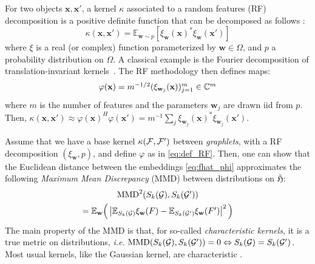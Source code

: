 \documentclass{article}
\begin{document}
For two objects $\mathbf{x}, \mathbf{x'}$, a kernel $\kappa$ associated to a random features (RF) decomposition is a positive definite function that can be decomposed  as follows \cite{rahimi2008random}:
\begin{equation}
\label{eq:RF_decomposition}
\kappa(\mathbf{x},\mathbf{x}')=\mathbb{E}_{\mathbf{w}\sim p}[ \xi_\mathbf{w}(\mathbf{x})^* \xi_\mathbf{w}(\mathbf{x}')]
\end{equation}
where $\xi$ is a real (or complex) function parameterized by $\mathbf{w} \in \Omega$, and $p$ a probability distribution on $\Omega$. A classical example is the Fourier decomposition of translation-invariant kernels~\cite{rahimi2008random}.
The RF methodology then defines maps:
\begin{equation}
	\label{eq:def_RF}
	\mathsmaller{
	\varphi(\mathbf{x}) = m^{-1/2} ( \xi_{\mathbf{w}_j}(\mathbf{x}) )_{j=1}^m \in \mathbb{C}^m}
\end{equation}
where $m$ is the number of features and the parameters $\mathbf{w}_j$ are drawn iid from $p$. Then, $\kappa(\mathbf{x},\mathbf{x}')\approx	\varphi(\mathbf{x})^H	\varphi(\mathbf{x}') = m^{-1} \sum_j \xi_{\mathbf{w}_j}(\mathbf{x})^* \xi_{\mathbf{w}_j}(\mathbf{x}')$. 

Assume that we have a base kernel $\kappa(\mathcal{F},\mathcal{F}')$ between \emph{graphlets}, with a RF decomposition $(\xi_\mathbf{w}, p)$, and define $\varphi$ as in \eqref{eq:def_RF}. Then, one can show \cite{Keriven2017a, Keriven2018} that the Euclidean distance between the embeddings \eqref{eq:fhat_phi} approximates the following \emph{Maximum Mean Discrepancy} (MMD) \cite{Gretton2007, Sriperumbudur2010} between distributions on $\bar{\mathfrak{H}}$:
 \begin{multline}\label{eq:MMD}
 \mathsmaller{
 \textup{MMD}^2(S_k(\G), S_k(\G'))} \\
 \mathsmaller{= \mathbb{E}_{\mathbf{w}} \Big( \left| \mathbb{E}_{S_k(\G)} \xi_\mathbf{w}(F) - \mathbb{E}_{S_k(\G')} \xi_\mathbf{w}(F') \right|^2 \Big)}
 \end{multline}
The main property of the MMD is that, for so-called \emph{characteristic kernels}, it is a true metric on distributions, \emph{i.e.} $\textup{MMD}(S_k(\mathcal{G}), S_k(\mathcal{G}')) = 0 \Leftrightarrow S_k(\mathcal{G}) = S_k(\mathcal{G}')$. %
Most usual kernels, like the Gaussian kernel, are characteristic \cite{Gretton2007, Sriperumbudur2010}.
%
\end{document}

